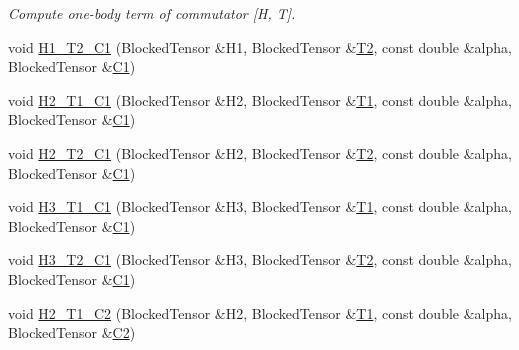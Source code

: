 \begin{DoxyCompactItemize}
\begin{DoxyCompactList}\small\item\em Compute one-\/body term of commutator \mbox{[}H, T\mbox{]}. \end{DoxyCompactList}\item 
void \mbox{\hyperlink{classforte_1_1_m_r_d_s_r_g___s_o_a073e35b83972e82c7374fac0697a0bed}{H1\+\_\+\+T2\+\_\+\+C1}} (Blocked\+Tensor \&H1, Blocked\+Tensor \&\mbox{\hyperlink{classforte_1_1_m_r_d_s_r_g___s_o_a43f64aec5c3777de5bc476ae946e0928}{T2}}, const double \&alpha, Blocked\+Tensor \&\mbox{\hyperlink{namespaceforte_abe00ec86d0015c0f2b6ac298c6e428e4a1a2ddc2db4693cfd16d534cde5572cc1}{C1}})
\item 
void \mbox{\hyperlink{classforte_1_1_m_r_d_s_r_g___s_o_a6a1a3daeda8c955b1bccd3eb6ebf349a}{H2\+\_\+\+T1\+\_\+\+C1}} (Blocked\+Tensor \&H2, Blocked\+Tensor \&\mbox{\hyperlink{classforte_1_1_m_r_d_s_r_g___s_o_afa42761edf9b73171b843cbb11b575c1}{T1}}, const double \&alpha, Blocked\+Tensor \&\mbox{\hyperlink{namespaceforte_abe00ec86d0015c0f2b6ac298c6e428e4a1a2ddc2db4693cfd16d534cde5572cc1}{C1}})
\item 
void \mbox{\hyperlink{classforte_1_1_m_r_d_s_r_g___s_o_a28dc2c4b8ce1a0253c145ba0b8f9ce86}{H2\+\_\+\+T2\+\_\+\+C1}} (Blocked\+Tensor \&H2, Blocked\+Tensor \&\mbox{\hyperlink{classforte_1_1_m_r_d_s_r_g___s_o_a43f64aec5c3777de5bc476ae946e0928}{T2}}, const double \&alpha, Blocked\+Tensor \&\mbox{\hyperlink{namespaceforte_abe00ec86d0015c0f2b6ac298c6e428e4a1a2ddc2db4693cfd16d534cde5572cc1}{C1}})
\item 
void \mbox{\hyperlink{classforte_1_1_m_r_d_s_r_g___s_o_a10964ab6886808861513945a485f2ecb}{H3\+\_\+\+T1\+\_\+\+C1}} (Blocked\+Tensor \&H3, Blocked\+Tensor \&\mbox{\hyperlink{classforte_1_1_m_r_d_s_r_g___s_o_afa42761edf9b73171b843cbb11b575c1}{T1}}, const double \&alpha, Blocked\+Tensor \&\mbox{\hyperlink{namespaceforte_abe00ec86d0015c0f2b6ac298c6e428e4a1a2ddc2db4693cfd16d534cde5572cc1}{C1}})
\item 
void \mbox{\hyperlink{classforte_1_1_m_r_d_s_r_g___s_o_aaac0be518cf00ea4ca0b2ce4e876445c}{H3\+\_\+\+T2\+\_\+\+C1}} (Blocked\+Tensor \&H3, Blocked\+Tensor \&\mbox{\hyperlink{classforte_1_1_m_r_d_s_r_g___s_o_a43f64aec5c3777de5bc476ae946e0928}{T2}}, const double \&alpha, Blocked\+Tensor \&\mbox{\hyperlink{namespaceforte_abe00ec86d0015c0f2b6ac298c6e428e4a1a2ddc2db4693cfd16d534cde5572cc1}{C1}})
\item 
void \mbox{\hyperlink{classforte_1_1_m_r_d_s_r_g___s_o_a66d47eb24a529ba16dfab6990a645207}{H2\+\_\+\+T1\+\_\+\+C2}} (Blocked\+Tensor \&H2, Blocked\+Tensor \&\mbox{\hyperlink{classforte_1_1_m_r_d_s_r_g___s_o_afa42761edf9b73171b843cbb11b575c1}{T1}}, const double \&alpha, Blocked\+Tensor \&\mbox{\hyperlink{namespaceforte_abe00ec86d0015c0f2b6ac298c6e428e4af1a543f5a2c5d49bc5dde298fcf716e4}{C2}})

\end{DoxyCompactItemize}
